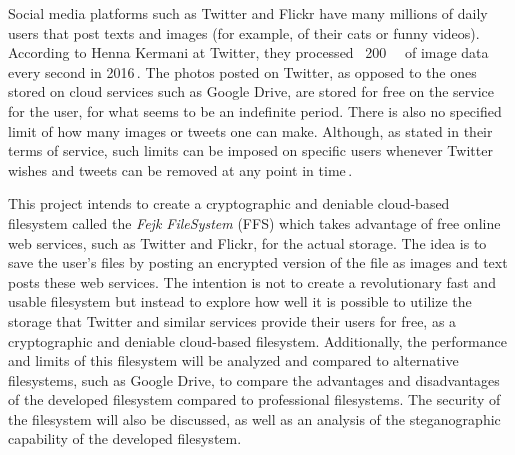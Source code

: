 Social media platforms such as Twitter and Flickr have many millions of daily users that post texts and images (for example, of their cats or funny videos). According to Henna Kermani at Twitter, they processed ~\SI{200}{\giga\byte} of image data every second in 2016\,\cite{MobileScaleLondona}. The photos posted on Twitter, as opposed to the ones stored on cloud services such as Google Drive, are stored for free on the service for the user, for what seems to be an indefinite period. There is also no specified limit of how many images or tweets one can make. Although, as stated in their terms of service, such limits can be imposed on specific users whenever Twitter wishes and tweets can be removed at any point in time\,\cite{twitterTwitterTermsService2021}.

This project intends to create a cryptographic and deniable cloud-based filesystem called the \textit{Fejk FileSystem} (\gls{FFS}) which takes advantage of free online web services, such as Twitter and Flickr, for the actual storage. The idea is to save the user's files by posting an encrypted version of the file as images and text posts these web services. The intention is not to create a revolutionary fast and usable filesystem but instead to explore how well it is possible to utilize the storage that Twitter and similar services provide their users for free, as a cryptographic and deniable cloud-based filesystem. Additionally, the performance and limits of this filesystem will be analyzed and compared to alternative filesystems, such as Google Drive, to compare the advantages and disadvantages of the developed filesystem compared to professional filesystems. The security of the filesystem will also be discussed, as well as an analysis of the steganographic capability of the developed filesystem.

%  











